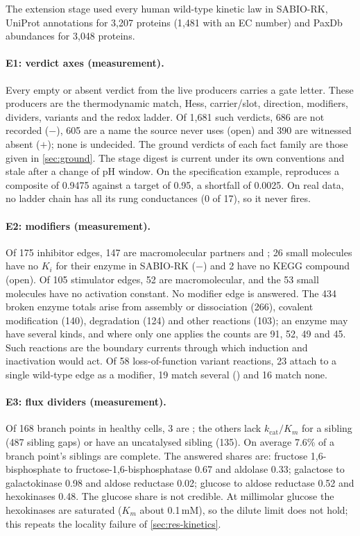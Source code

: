 The extension stage used every human wild-type kinetic law in SABIO-RK, UniProt annotations for 3{,}207 proteins (1{,}481 with an EC number) and PaxDb abundances for 3{,}048 proteins.

\paragraph{E1: verdict axes (measurement).}
Every empty or absent verdict from the live producers carries a gate letter.
These producers are the thermodynamic match, Hess, carrier/slot, direction, modifiers, dividers, variants and the redox ladder.
Of 1{,}681 such verdicts, 686 are not recorded ($-$), 605 are a name the source never uses (\textsf{open}) and 390 are witnessed absent ($+$); none is undecided.
The ground verdicts of each fact family are those given in \cref{sec:ground}.
The stage digest is current under its own conventions and stale after a change of pH window.
On the specification example,  reproduces a composite of 0.9475 against a target of 0.95, a shortfall of 0.0025.
On real data, no ladder chain has all its rung conductances (0 of 17), so it never fires.

\paragraph{E2: modifiers (measurement).}
Of 175 inhibitor edges, 147 are macromolecular partners and ; 26 small molecules have no $K_i$ for their enzyme in SABIO-RK ($-$) and 2 have no KEGG compound (\textsf{open}).
Of 105 stimulator edges, 52 are macromolecular, and the 53 small molecules have no activation constant.
No modifier edge is answered.
The 434 broken enzyme totals arise from assembly or dissociation (266), covalent modification (140), degradation (124) and other reactions (103); an enzyme may have several kinds, and where only one applies the counts are 91, 52, 49 and 45.
Such reactions are the boundary currents through which induction and inactivation would act.
Of 58 loss-of-function variant reactions, 23 attach to a single wild-type edge as a modifier, 19 match several () and 16 match none.

\paragraph{E3: flux dividers (measurement).}
Of 168 branch points in healthy cells, 3 are ; the others lack $k_{\mathrm{cat}}/K_m$ for a sibling (487 sibling gaps) or have an uncatalysed sibling (135).
On average 7.6\% of a branch point's siblings are complete.
The answered shares are: fructose 1,6-bisphosphate to fructose-1,6-bisphosphatase 0.67 and aldolase 0.33; galactose to galactokinase 0.98 and aldose reductase 0.02; glucose to aldose reductase 0.52 and hexokinases 0.48.
The glucose share is not credible.
At millimolar glucose the hexokinases are saturated ($K_m$ about 0.1\,mM), so the dilute limit does not hold; this repeats the locality failure of \cref{sec:res-kinetics}.

